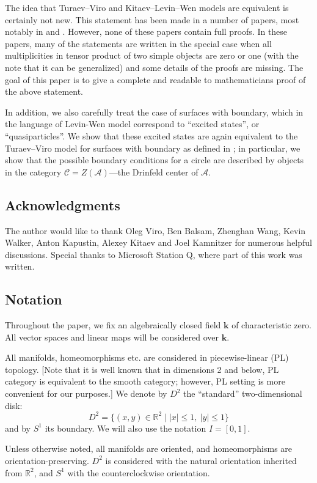 \documentclass{amsart}
\theoremstyle{definition}
\theoremstyle{remark}
\numberwithin{equation}{section}
\newcommand{\st}{\; | \;}                               %
\newcommand{\<}{\langle}
\renewcommand{\>}{\rangle}
\newcommand{\kk}{\mathbf{k}}       %
\newcommand{\R}{\mathbb{R}}       %
\newcommand{\C}{\mathcal{C}}      %
\newcommand{\A}{\mathcal{A}}      %
\begin{document}
The idea that Turaev--Viro  and Kitaev--Levin--Wen models are equivalent is 
certainly not new. This statement has been made in a number of papers, most 
notably in  and . However, none of these 
papers contain full proofs.  In these papers, many of  the  
statements are written in the special case when all multiplicities in 
tensor product of two simple objects are zero or one (with the note that it 
can be generalized)  and some details of the proofs are missing. The goal of 
this paper is to give a complete  and readable to mathematicians proof of 
the above statement.

In addition, we also carefully treat the case of surfaces with boundary, 
which in the  language of Levin-Wen model correspond to ``excited states'', 
or ``quasiparticles''.  We show that these excited states are again 
equivalent to the Turaev--Viro model   for  surfaces with boundary 
as defined in ; in particular, we  show that  
the possible boundary conditions for a circle are described by 
objects in the category  $\C=Z(\A)$---the Drinfeld center of $\A$. 

\subsection*{Acknowledgments}
The author would like to thank Oleg Viro, Ben Balsam, Zhenghan Wang, Kevin
Walker, Anton Kapustin, Alexey Kitaev and Joel Kamnitzer for numerous
helpful discussions. Special thanks to Microsoft Station Q, where part of
this work was written.  

\subsection*{Notation}
Throughout the paper, we fix an algebraically closed field $\kk$ of
characteristic zero. All vector spaces and linear maps will be  
considered over $\kk$.

All manifolds, homeomorphisms etc. are considered in piecewise-linear (PL)
topology. [Note that it is well known that in dimensions 2 and below, PL
category is equivalent to the smooth category; however, PL setting is more
convenient for our purposes.] We denote by $D^2$ the ``standard''
two-dimensional disk:  
$$
D^2=\{(x,y)\in \R^2\st |x|\le 1,\ |y|\le 1\}
$$
and by $S^1$ its boundary. We will also use the notation $I=[0,1]$. 

Unless otherwise noted, all manifolds are oriented, and homeomorphisms are
orientation-preserving. $D^2$ is considered with the natural orientation
inherited from $\R^2$, and $S^1$ with the counterclockwise orientation. 
\end{document}
